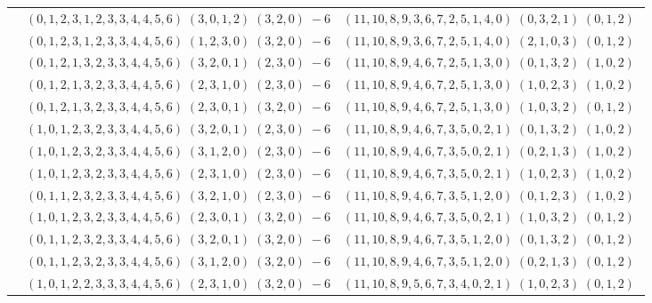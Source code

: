 \documentclass[11pt]{article}
\begin{document}
\begin{longtable}[l]{|c|c|c|}
 \cline{2-3} 
 & $(0 ,1 ,2 ,3 ,1 ,2 ,3 ,3 ,4 ,4 ,5 ,6) \;(3 ,0 ,1 ,2) \;(3 ,2 ,0) \;-6$ & $(11 ,10 ,8 ,9 ,3 ,6 ,7 ,2 ,5 ,1 ,4 ,0) \;(0 ,3 ,2 ,1) \;(0 ,1 ,2) \;$\\ 
 \cline{2-3} 
 & $(0 ,1 ,2 ,3 ,1 ,2 ,3 ,3 ,4 ,4 ,5 ,6) \;(1 ,2 ,3 ,0) \;(3 ,2 ,0) \;-6$ & $(11 ,10 ,8 ,9 ,3 ,6 ,7 ,2 ,5 ,1 ,4 ,0) \;(2 ,1 ,0 ,3) \;(0 ,1 ,2) \;$\\ 
 \cline{2-3} 
 & $(0 ,1 ,2 ,1 ,3 ,2 ,3 ,3 ,4 ,4 ,5 ,6) \;(3 ,2 ,0 ,1) \;(2 ,3 ,0) \;-6$ & $(11 ,10 ,8 ,9 ,4 ,6 ,7 ,2 ,5 ,1 ,3 ,0) \;(0 ,1 ,3 ,2) \;(1 ,0 ,2) \;$\\ 
 \cline{2-3} 
 & $(0 ,1 ,2 ,1 ,3 ,2 ,3 ,3 ,4 ,4 ,5 ,6) \;(2 ,3 ,1 ,0) \;(2 ,3 ,0) \;-6$ & $(11 ,10 ,8 ,9 ,4 ,6 ,7 ,2 ,5 ,1 ,3 ,0) \;(1 ,0 ,2 ,3) \;(1 ,0 ,2) \;$\\ 
 \cline{2-3} 
 & $(0 ,1 ,2 ,1 ,3 ,2 ,3 ,3 ,4 ,4 ,5 ,6) \;(2 ,3 ,0 ,1) \;(3 ,2 ,0) \;-6$ & $(11 ,10 ,8 ,9 ,4 ,6 ,7 ,2 ,5 ,1 ,3 ,0) \;(1 ,0 ,3 ,2) \;(0 ,1 ,2) \;$\\ 
 \cline{2-3} 
 & $(1 ,0 ,1 ,2 ,3 ,2 ,3 ,3 ,4 ,4 ,5 ,6) \;(3 ,2 ,0 ,1) \;(2 ,3 ,0) \;-6$ & $(11 ,10 ,8 ,9 ,4 ,6 ,7 ,3 ,5 ,0 ,2 ,1) \;(0 ,1 ,3 ,2) \;(1 ,0 ,2) \;$\\ 
 \cline{2-3} 
 & $(1 ,0 ,1 ,2 ,3 ,2 ,3 ,3 ,4 ,4 ,5 ,6) \;(3 ,1 ,2 ,0) \;(2 ,3 ,0) \;-6$ & $(11 ,10 ,8 ,9 ,4 ,6 ,7 ,3 ,5 ,0 ,2 ,1) \;(0 ,2 ,1 ,3) \;(1 ,0 ,2) \;$\\ 
 \cline{2-3} 
 & $(1 ,0 ,1 ,2 ,3 ,2 ,3 ,3 ,4 ,4 ,5 ,6) \;(2 ,3 ,1 ,0) \;(2 ,3 ,0) \;-6$ & $(11 ,10 ,8 ,9 ,4 ,6 ,7 ,3 ,5 ,0 ,2 ,1) \;(1 ,0 ,2 ,3) \;(1 ,0 ,2) \;$\\ 
 \cline{2-3} 
 & $(0 ,1 ,1 ,2 ,3 ,2 ,3 ,3 ,4 ,4 ,5 ,6) \;(3 ,2 ,1 ,0) \;(2 ,3 ,0) \;-6$ & $(11 ,10 ,8 ,9 ,4 ,6 ,7 ,3 ,5 ,1 ,2 ,0) \;(0 ,1 ,2 ,3) \;(1 ,0 ,2) \;$\\ 
 \cline{2-3} 
 & $(1 ,0 ,1 ,2 ,3 ,2 ,3 ,3 ,4 ,4 ,5 ,6) \;(2 ,3 ,0 ,1) \;(3 ,2 ,0) \;-6$ & $(11 ,10 ,8 ,9 ,4 ,6 ,7 ,3 ,5 ,0 ,2 ,1) \;(1 ,0 ,3 ,2) \;(0 ,1 ,2) \;$\\ 
 \cline{2-3} 
 & $(0 ,1 ,1 ,2 ,3 ,2 ,3 ,3 ,4 ,4 ,5 ,6) \;(3 ,2 ,0 ,1) \;(3 ,2 ,0) \;-6$ & $(11 ,10 ,8 ,9 ,4 ,6 ,7 ,3 ,5 ,1 ,2 ,0) \;(0 ,1 ,3 ,2) \;(0 ,1 ,2) \;$\\ 
 \cline{2-3} 
 & $(0 ,1 ,1 ,2 ,3 ,2 ,3 ,3 ,4 ,4 ,5 ,6) \;(3 ,1 ,2 ,0) \;(3 ,2 ,0) \;-6$ & $(11 ,10 ,8 ,9 ,4 ,6 ,7 ,3 ,5 ,1 ,2 ,0) \;(0 ,2 ,1 ,3) \;(0 ,1 ,2) \;$\\ 
 \cline{2-3} 
 & $(1 ,0 ,1 ,2 ,2 ,3 ,3 ,3 ,4 ,4 ,5 ,6) \;(2 ,3 ,1 ,0) \;(3 ,2 ,0) \;-6$ & $(11 ,10 ,8 ,9 ,5 ,6 ,7 ,3 ,4 ,0 ,2 ,1) \;(1 ,0 ,2 ,3) \;(0 ,1 ,2) \;$\\ 

\end{longtable}
\end{document}
